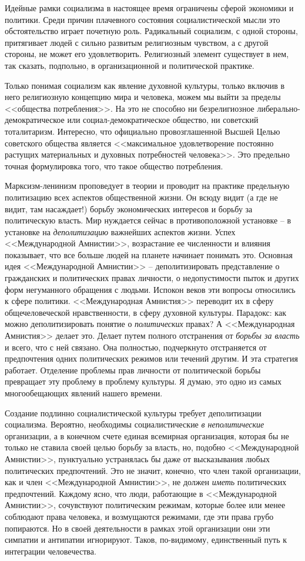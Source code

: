 \documentclass{book}
\begin{document}
Идейные рамки социализма в настоящее время ограничены сферой экономики и политики. Среди причин плачевного состояния социалистической мысли это обстоятельство играет почетную роль. Радикальный социализм, с одной стороны, притягивает людей с сильно развитым религиозным чувством, а с другой стороны, не может его удовлетворить. Религиозный элемент существует в нем, так сказать, подпольно, в организационной и политической практике.

Только понимая социализм как явление духовной культуры, только включив в него религиозную концепцию мира и человека, можем мы выйти за пределы <<общества потребления>>. На это не способно ни безрелигиозное либерально-демократическое или социал-демократическое общество, ни советский тоталитаризм. Интересно, что официально провозглашенной Высшей Целью советского общества является <<максимальное удовлетворение постоянно растущих материальных и духовных потребностей человека>>. Это предельно точная формулировка того, что такое общество потребления.

Марксизм-ленинизм проповедует в теории и проводит на практике предельную политизацию всех аспектов обществен­ной жизни. Он всюду видит (а где не видит, там насаждает!) борьбу экономических интересов и борьбу за политическую власть. Мир нуждается сейчас в противоположной установке -- в установке на \textit{деполитизацию}  важнейших аспектов жизни. Успех <<Международной Амнистии>>, возрастание ее численно­сти и влияния показывает, что все больше людей на планете начи­нает понимать это. Основная идея <<Международной Амнистии>> -- деполитизировать представление о гражданских и поли­тических правах личности, о недопустимости пыток и других форм негуманного обращения с людьми. Испокон веков эти вопросы относились к сфере политики. <<Международная Амни­стия>> переводит их в сферу общечеловеческой нравственности, в сферу духовной культуры. Парадокс: как можно деполитизи­ровать понятие о \textit{политических}  правах? А <<Международная Амнистия>> делает это. Делает путем полного отстранения от \textit{борьбы за 
власть}  и всего, что с ней связано. Она полностью, подчеркнуто отстраняется от предпочтения одних политиче­ских режимов или течений другим. И эта стратегия работает. Отделение проблемы прав личности от политической борьбы превращает эту проблему в проблему культуры. Я думаю, это одно из самых многообещающих явлений нашего времени.

Создание подлинно социалистической культуры требует деполитизации социализма. Вероятно, необходимы социалисти­ческие \textit{в неполитические}  организации, а в конечном счете еди­ная всемирная организация, которая бы не только не ставила своей целью борьбу за власть, но, подобно <<Международной Амнистии>>, пунктуально устранялась бы даже от высказывания любых политических предпочтений. Это не значит, конеч­но, что член такой организации, как и член <<Международной Амнистии>>, не должен \textit{иметь}  политических предпочтений. Каж­дому ясно, что люди, работающие в <<Международной Амни­стии>>, сочувствуют политическим режимам, которые более или менее соблюдают права человека, и возмущаются режимами, где эти права грубо попираются. Но в своей деятельности в рам­ках этой организации они эти симпатии и антипатии игнорируют. Таков, по-видимому, единственный путь к интеграции челове­чества.
\end{document}
